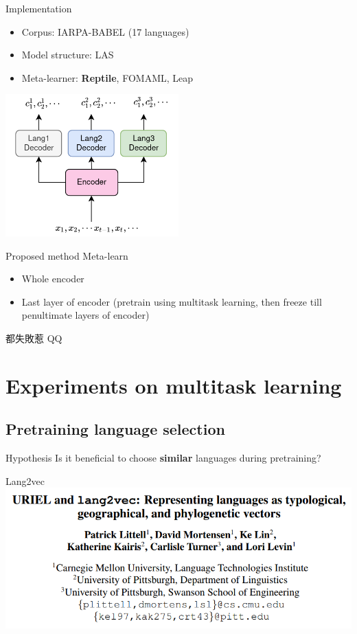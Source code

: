 \documentclass{beamer}
\begin{document}
\begin{frame}[t]{Implementation}
  \begin{itemize}
    \item Corpus: IARPA-BABEL (17 languages)
    \item Model structure: LAS
    \item Meta-learner: \textbf{Reptile}, FOMAML, Leap
  \end{itemize}
  \center \includegraphics[width=0.5\textwidth]{fig/MultiTaskASR.png}
\end{frame}

\begin{frame}{Proposed method}
  Meta-learn
  \begin{itemize}
    \item Whole encoder
    \item Last layer of encoder (pretrain using multitask learning, then freeze till penultimate layers of encoder)
  \end{itemize}
  \pause
  \center 都失敗惹 QQ
\end{frame}

\section{Experiments on multitask learning}


\subsection{Pretraining language selection}
\begin{frame}{Hypothesis}
  Is it beneficial to choose \textbf{similar} languages during pretraining?
\end{frame}

\begin{frame}[t]{Lang2vec}
  \center \includegraphics[width=\textwidth]{fig/lang2vec.png}
\end{frame}
\end{document}
